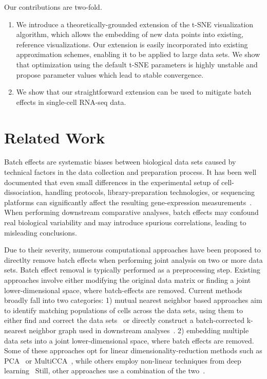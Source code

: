 \documentclass[runningheads]{llncs}
\begin{document}
Our contributions are two-fold. 
\begin{enumerate}
  \item We introduce a theoretically-grounded extension of the t-SNE
  visualization algorithm, which allows the embedding of new data points into
  existing, reference visualizations. Our extension is easily incorporated into
  existing approximation schemes, enabling it to be applied to large data sets.
  We show that optimization using the default t-SNE parameters is highly
  unstable and propose parameter values which lead to stable convergence.
  \item We show that our straightforward extension can be used to mitigate batch
  effects in single-cell RNA-seq data.
\end{enumerate}


\section{Related Work}

Batch effects are systematic biases between biological data sets caused by
technical factors in the data collection and preparation process. It has been
well documented that even small differences in the experimental setup of
cell-dissociation, handling protocols, library-preparation technologies, or
sequencing platforms can significantly affect the resulting gene-expression
measurements~\cite{Tung2017,Hicks2018}. When performing downstream comparative
analyses, batch effects may confound real biological variability and may
introduce spurious correlations, leading to misleading conclusions.

Due to their severity, numerous computational approaches have been proposed to
directlty remove batch effects when performing joint analysis on two or more data sets.
Batch effect removal is typically performed as a preprocessing step. Existing
approaches involve either modifying the original data matrix or finding a joint
lower-dimensional space, where batch-effects are removed. Current methods
broadly fall into two categories: 1) mutual nearest neighbor based approaches
aim to identify matching populations of cells across the data sets, using them
to either find and correct the data sets~\cite{Haghverdi2018} or directly
construct a batch-corrected k-nearest neighbor graph used in downstream
analyses~\cite{Park2018}. 2) embedding multiple data sets into a joint
lower-dimensional space, where batch effects are removed. Some of these
approaches opt for linear dimensionality-reduction methods such as
PCA~\cite{Korsunsky2019} or MultiCCA~\cite{Butler2018}, while others employ
non-linear techniques from deep learning~\cite{Li2020,Lopez2018} Still, other
approaches use a combination of the two~\cite{Stuart2019,Hie2019}.
\end{document}
